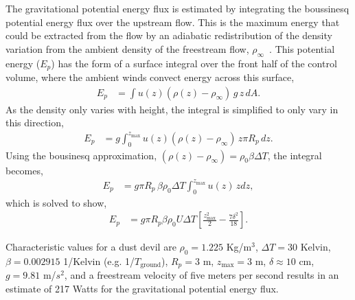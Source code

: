 The gravitational potential energy flux is estimated by integrating the
boussinesq potential energy flux over the upstream flow. 
This is the maximum energy that could be extracted from the flow by an 
adiabatic redistribution of the density variation from the ambient 
density of the freestream flow,
$\rho_\infty$~\cite{hatsopoulos1965principles}. This potential energy  
($E_p$) has the form of a surface integral over the front half of the
control volume, where the ambient winds convect energy across this surface,
\begin{align*}
  E_p & = \int u(z) (\rho(z)-\rho_\infty) \, g \, z \, dA. 
\end{align*}
As the density only varies with height, the integral is simplified to
only vary in this direction,
\begin{align*}
  E_p  & = g \int^{z_\text{max}}_0 u(z) (\rho(z)-\rho_\infty) \, z  \pi
 R_p \, dz.
\end{align*}
Using the bousinesq approximation, $(\rho(z)-\rho_\infty)  = \rho_0 \beta \Delta T$,
the integral becomes, 
\begin{align*}
  E_p & = g  \pi R_p \, \beta \rho_0 \Delta T \int^{z_\text{max}}_0 u(z) \, z dz,
\end{align*}
which is solved to show,
\begin{align}
  E_p & = g  \pi R_p \beta \rho_0 U \Delta T \left[ \frac{z_\text{max}^2}{2} - \frac{7 \delta^2}{18} \right].\label{eq:potential}
\end{align}

%
% 
%
%
%

Characteristic values for a dust devil are $\rho_0 = 1.225$ Kg/$\text{m}^3$, 
$\Delta T= 30$ Kelvin, $\beta = 0.002915$ 1/Kelvin (e.g. 1/$T_{\text{ground}}$), 
$R_p = 3 $ m, $z_\text{max} = 3$ m, $\delta \approx 10$ cm, $g=9.81$
m/$s^2$, and a freestream velocity of five meters per second results in
an estimate of 217 Watts for the gravitational potential energy
flux.

